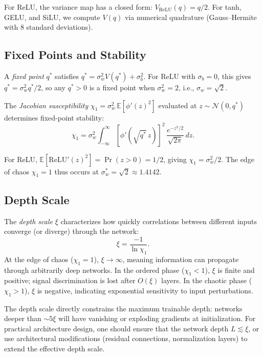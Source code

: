 \documentclass[10pt]{article}
\theoremstyle{definition}
\begin{document}
For ReLU, the variance map has a closed form: $V_{\text{ReLU}}(q) = q/2$.
For tanh, GELU, and SiLU, we compute $V(q)$ via numerical quadrature (Gauss--Hermite with 8 standard deviations).

\subsection{Fixed Points and Stability}

A \emph{fixed point} $q^*$ satisfies $q^* = \sigma_w^2 V(q^*) + \sigma_b^2$.
For ReLU with $\sigma_b = 0$, this gives $q^* = \sigma_w^2 q^*/2$, so any $q^* > 0$ is a fixed point when $\sigma_w^2 = 2$, i.e., $\sigma_w = \sqrt{2}$.

The \emph{Jacobian susceptibility} $\chi_1 = \sigma_w^2 \, \mathbb{E}[\phi'(z)^2]$ evaluated at $z \sim \mathcal{N}(0, q^*)$ determines fixed-point stability:
\begin{equation}
  \chi_1 = \sigma_w^2 \int_{-\infty}^{\infty} [\phi'(\sqrt{q^*}\, z)]^2 \, \frac{e^{-z^2/2}}{\sqrt{2\pi}}\, dz.
  \label{eq:chi1}
\end{equation}

For ReLU, $\mathbb{E}[\text{ReLU}'(z)^2] = \Pr(z > 0) = 1/2$, giving $\chi_1 = \sigma_w^2/2$.
The edge of chaos $\chi_1 = 1$ thus occurs at $\sigma_w^* = \sqrt{2} \approx 1.4142$.

\subsection{Depth Scale}

The \emph{depth scale} $\xi$ characterizes how quickly correlations between different inputs converge (or diverge) through the network:
\begin{equation}
  \xi = \frac{-1}{\ln \chi_1}.
  \label{eq:depth-scale}
\end{equation}
At the edge of chaos ($\chi_1 = 1$), $\xi \to \infty$, meaning information can propagate through arbitrarily deep networks.
In the ordered phase ($\chi_1 < 1$), $\xi$ is finite and positive; signal discrimination is lost after $O(\xi)$ layers.
In the chaotic phase ($\chi_1 > 1$), $\xi$ is negative, indicating exponential sensitivity to input perturbations.

The depth scale directly constrains the maximum trainable depth: networks deeper than $\sim 5\xi$ will have vanishing or exploding gradients at initialization.
For practical architecture design, one should ensure that the network depth $L \lesssim \xi$, or use architectural modifications (residual connections, normalization layers) to extend the effective depth scale.
\end{document}
